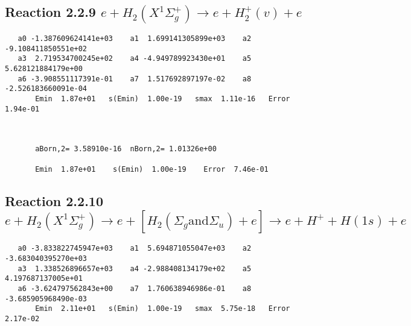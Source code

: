 \documentclass[12pt]{article}
\begin{document}
\newpage
\subsection{
Reaction 2.2.9 $e + H_2(X^1\Sigma_g^+) \rightarrow e + H_2^+(v) + e$}
















\begin{small}\begin{verbatim}
   a0 -1.387609624141e+03    a1  1.699141305899e+03    a2 -9.108411850551e+02
   a3  2.719534700245e+02    a4 -4.949789923430e+01    a5  5.628121884179e+00
   a6 -3.908551117391e-01    a7  1.517692897197e-02    a8 -2.526183660091e-04
       Emin  1.87e+01   s(Emin)  1.00e-19   smax  1.11e-16   Error  1.94e-01



       aBorn,2= 3.58910e-16  nBorn,2= 1.01326e+00

       Emin  1.87e+01    s(Emin)  1.00e-19    Error  7.46e-01
\end{verbatim}\end{small}




\newpage
\subsection{
Reaction 2.2.10 $e + H_2(X^1\Sigma_g^+) \rightarrow e + [H_2(\Sigma_g 
\mbox{and} \Sigma_u) + e] \rightarrow e + H^+ + H(1s) + e$}
















\begin{small}\begin{verbatim}
   a0 -3.833822745947e+03    a1  5.694871055047e+03    a2 -3.683040395270e+03
   a3  1.338526896657e+03    a4 -2.988408134179e+02    a5  4.197687137005e+01
   a6 -3.624797562843e+00    a7  1.760638946986e-01    a8 -3.685905968490e-03
       Emin  2.11e+01   s(Emin)  1.00e-19   smax  5.75e-18   Error  2.17e-02
\end{verbatim}\end{small}
\end{document}
